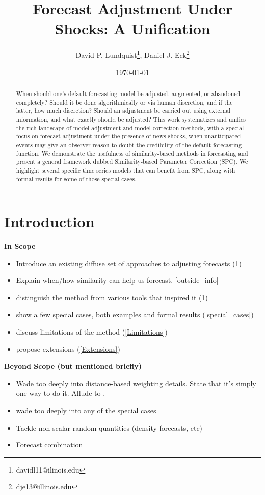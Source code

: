 \documentclass[11pt]{article}
\title{Forecast Adjustment Under Shocks: A Unification}
\author{David P. Lundquist\thanks{davidl11@ilinois.edu}, Daniel J. Eck\thanks{dje13@illinois.edu} }
\affil{Department of Statistics, University of Illinois at Urbana-Champaign}
\date{\today}
\theoremstyle{definition}
\begin{document}
\maketitle

\begin{abstract} 
  When should one's default forecasting model be adjusted, augmented, or abandoned completely?  Should it be done algorithmically or via human discretion, and if the latter, how much discretion?  Should an adjustment be carried out using external information, and what exactly should be adjusted?  This work systematizes and unifies the rich landscape of model adjustment and model correction methods, with a special focus on forecast adjustment under the presence of news shocks, when unanticipated events may give an observer reason to doubt the credibility of the default forecasting function.  We demonstrate the usefulness of similarity-based methods in forecasting and present a general framework dubbed Similarity-based Parameter Correction (SPC).  We highlight several specific time series models that can benefit from SPC, along with formal results for some of those special cases.
\end{abstract}


\section{Introduction}\label{Introduction}

\textbf{In Scope}
\begin{itemize}
  \item Introduce an existing diffuse set of approaches to adjusting forecasts (\ref{Introduction})
  \item Explain when/how similarity can help us forecast. \ref{outside_info}
  \item distinguish the method from various tools that inspired it (\ref{Introduction})
  \item show a few special cases, both examples and formal results (\ref{special_cases})
  \item discuss limitations of the method (\ref{Limitations})
  \item propose extensions (\ref{Extensions})
\end{itemize}
\textbf{Beyond Scope (but mentioned briefly)}
\begin{itemize}
  \item Wade too deeply into distance-based weighting details.  State that it's simply one way to do it.  Allude to \cite{lin2021minimizing,lundquist2024volatility}.
  \item wade too deeply into any of the special cases
  \item Tackle non-scalar random quantities (density forecasts, etc)
  \item Forecast combination
\end{itemize}
\end{document}
